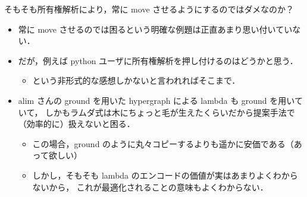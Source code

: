 \documentclass[10pt, a4j, twocolumn]{scrartcl}
\begin{document}
そもそも所有権解析により，常に move させるようにするのではダメなのか？
\begin{itemize}
\item 常に move させるのでは困るという明確な例題は正直あまり思い付いていない．
\item だが，例えば python ユーザに所有権解析を押し付けるのはどうかと思う．
\begin{itemize}
\item という非形式的な感想しかないと言われればそこまで．
\end{itemize}
\item alim さんの ground を用いた hypergraph による lambda も ground を用いていて，
しかもラムダ式は木にちょっと毛が生えたくらいだから提案手法で（効率的に）扱えないと困る．
\begin{itemize}
\item この場合，ground のように丸々コピーするよりも遥かに安価である（あって欲しい）
\item しかし，そもそも lambda のエンコードの価値が実はあまりよくわからないから，
これが最適化されることの意味もよくわからない．
\end{itemize}
\end{itemize}
\end{document}
